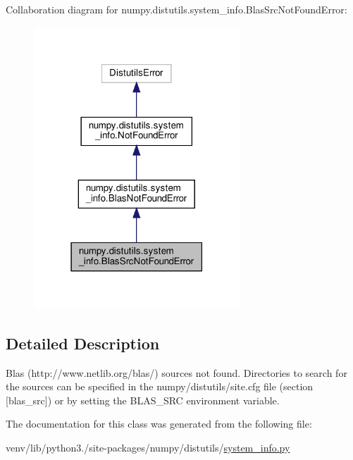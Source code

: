 Collaboration diagram for numpy.\+distutils.\+system\+\_\+info.\+Blas\+Src\+Not\+Found\+Error\+:
\nopagebreak
\begin{figure}[H]
\begin{center}
\leavevmode
\includegraphics[width=219pt]{classnumpy_1_1distutils_1_1system__info_1_1BlasSrcNotFoundError__coll__graph}
\end{center}
\end{figure}


\subsection{Detailed Description}
\begin{DoxyVerb}Blas (http://www.netlib.org/blas/) sources not found.
Directories to search for the sources can be specified in the
numpy/distutils/site.cfg file (section [blas_src]) or by setting
the BLAS_SRC environment variable.\end{DoxyVerb}
 

The documentation for this class was generated from the following file\+:\begin{DoxyCompactItemize}
\item 
venv/lib/python3./site-\/packages/numpy/distutils/\hyperlink{system__info_8py}{system\+\_\+info.\+py}\end{DoxyCompactItemize}
